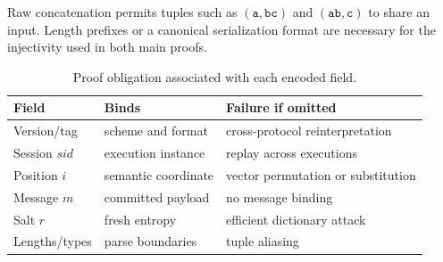  Raw concatenation permits tuples such as
$(\mathtt{a},\mathtt{bc})$ and $(\mathtt{ab},\mathtt{c})$ to share an input.
Length prefixes or a canonical serialization format are necessary for the
injectivity used in both main proofs.

\begin{table}[t]
\caption{Proof obligation associated with each encoded field.}
\label{tab:fields}
\centering
\small
\begin{tabular}{@{}p{}p{}p{}@{}}
\toprule
Field & Binds & Failure if omitted \\
\midrule
Version/tag & scheme and format & cross-protocol reinterpretation \\
Session $sid$ & execution instance & replay across executions \\
Position $i$ & semantic coordinate & vector permutation or substitution \\
Message $m$ & committed payload & no message binding \\
Salt $r$ & fresh entropy & efficient dictionary attack \\
Lengths/types & parse boundaries & tuple aliasing \\
\bottomrule
\end{tabular}
\end{table}

